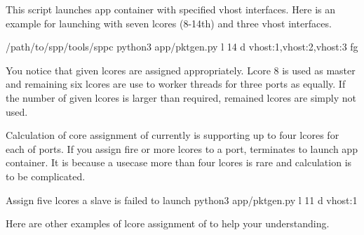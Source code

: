 \documentclass[a4paper,11pt,openany,oneside,english]{sphinxmanual}
\begin{document}
This  script launches  app container
with specified vhost interfaces.
Here is an example for launching with seven lcores (8-14th)
and three vhost interfaces.

\begin{sphinxVerbatim}[commandchars=\\\{\},formatcom=\footnotesize]
  /path/to/spp/tools/sppc
 python3 app/pktgen.py \PYGZhy{}l \PYGZhy{}14 \PYGZhy{}d vhost:1,vhost:2,vhost:3 
  \PYGZhy{}fg
\end{sphinxVerbatim}

You notice that given lcores  are assigned appropriately.
Lcore 8 is used as master and remaining six lcores are use to worker
threads for three ports as  equally.
If the number of given lcores is larger than required,
remained lcores are simply not used.

Calculation of core assignment of  currently is supporting
up to four lcores for each of ports.
If you assign fire or more lcores to a port,  terminates
to launch app container.
It is because a usecase more than four lcores is rare and
calculation is to be complicated.

\begin{sphinxVerbatim}[commandchars=\\\{\},formatcom=\footnotesize]
 Assign five lcores  a slave is failed to launch
 python3 app/pktgen.py \PYGZhy{}l \PYGZhy{}11 \PYGZhy{}d vhost:1
\end{sphinxVerbatim}

Here are other examples of lcore assignment of  to help
your understanding.
\end{document}
